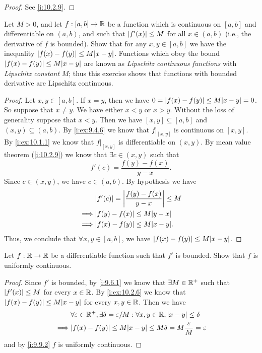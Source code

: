 \begin{proof}
  See \cref{i:10.2.9}.
\end{proof}

\begin{ex}\label{i:ex:10.2.6}
  Let \(M > 0\), and let \(f : [a, b] \to \mathbb{R}\) be a function which is continuous on \([a, b]\) and differentiable on \((a, b)\), and such that \(\left\lvert f'(x)\right\rvert \leq M\) for all \(x \in (a, b)\) (i.e., the derivative of \(f\) is bounded).
  Show that for any \(x, y \in [a, b]\) we have the inequality \(\abs{f(x) - f(y)} \leq M \abs{x - y}\).
  Functions which obey the bound \(\abs{f(x) - f(y)} \leq M \abs{x - y}\) are known as \emph{Lipschitz continuous functions} with \emph{Lipschitz constant} \(M\);
  thus this exercise shows that functions with bounded derivative are Lipschitz continuous.
\end{ex}

\begin{proof}
  Let \(x, y \in [a, b]\).
  If \(x = y\), then we have \(0 = \abs{f(x) - f(y)} \leq M \abs{x - y} = 0\).
  So suppose that \(x \neq y\).
  We have either \(x < y\) or \(x > y\).
  Without the loss of generality suppose that \(x < y\).
  Then we have \([x, y] \subseteq [a, b]\) and \((x, y) \subseteq (a, b)\).
  By \cref{i:ex:9.4.6} we know that \(f|_{[x, y]}\) is continuous on \([x, y]\).
  By \cref{i:ex:10.1.1} we know that \(f|_{[x, y]}\) is differentiable on \((x, y)\).
  By mean value theorem (\cref{i:10.2.9}) we know that \(\exists c \in (x, y)\) such that
  \[
    f'(c) = \dfrac{f(y) - f(x)}{y - x}.
  \]
  Since \(c \in (x, y)\), we have \(c \in (a, b)\).
  By hypothesis we have
  \begin{align*}
             & \abs{f'(c)} = \abs{\dfrac{f(y) - f(x)}{y - x}} \leq M \\
    \implies & \abs{f(y) - f(x)} \leq M \abs{y - x}                  \\
    \implies & \abs{f(x) - f(y)} \leq M \abs{x - y}.
  \end{align*}
  Thus, we conclude that \(\forall x, y \in [a, b]\), we have \(\abs{f(x) - f(y)} \leq M \abs{x - y}\).
\end{proof}

\begin{ex}\label{i:ex:10.2.7}
  Let \(f : \mathbb{R} \to \mathbb{R}\) be a differentiable function such that \(f'\) is bounded.
  Show that \(f\) is uniformly continuous.
\end{ex}

\begin{proof}
  Since \(f'\) is bounded, by \cref{i:9.6.1} we know that \(\exists M \in \mathbb{R}^+\) such that \(\left\lvert f'(x)\right\rvert \leq M\) for every \(x \in \mathbb{R}\).
  By \cref{i:ex:10.2.6} we know that \(\abs{f(x) - f(y)} \leq M \abs{x - y}\) for every \(x, y \in \mathbb{R}\).
  Then we have
  \begin{align*}
             & \forall \varepsilon \in \R^+, \exists \delta = \varepsilon / M : \forall x, y \in \R, \abs{x - y} \leq \delta \\
    \implies & \abs{f(x) - f(y)} \leq M \abs{x - y} \leq M \delta = M \dfrac{\varepsilon}{M} = \varepsilon
  \end{align*}
  and by \cref{i:9.9.2} \(f\) is uniformly continuous.
\end{proof}
